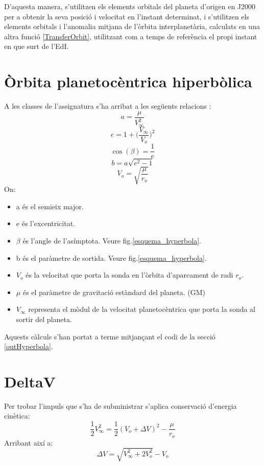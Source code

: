 D'aquesta manera, s'utilitzen els elements orbitals del planeta d'origen en J2000 per a obtenir la seva posició i velocitat en l'instant determinat, i s'utilitzen els elements orbitals i l'anomalia mitjana de l'òrbita interplanetària, calculats en una altra funció \ref{TransferOrbit}, utilitzant com a temps de referència el propi instant en que surt de l'EdI.

\section{Òrbita planetocèntrica hiperbòlica}
A les classes de l'assignatura s'ha arribat a les següents relacions \cite{Calaf2017d}:
\begin{equation}
a = \frac{\mu}{V_{\infty}^{2}}
\end{equation}
\begin{equation}
e = 1 + \Big(\frac{V_{\infty}}{V_{o}}\Big)^2
\end{equation}
\begin{equation}
\cos(\beta) = \frac{1}{e}
\end{equation}
\begin{equation}
b = a\sqrt{e^2-1}
\end{equation}
\begin{equation}
V_o = \sqrt{\frac{\mu}{r_o}}
\end{equation}
On:
\begin{itemize}
	\item a és el semieix major.
	\item e és l'excentricitat.
	\item $\beta$ és l'angle de l'asímptota. Veure fig.\ref{esquema_hyperbola}.
	\item b és el paràmetre de sortida. Veure fig.\ref{esquema_hyperbola}.
	\item $V_o$ és la velocitat que porta la sonda en l'òrbita d'aparcament de radi $r_o$.
	\item $\mu$ és el paràmetre de gravitació estàndard del planeta. (GM)
	\item $V_{\infty}$ representa el mòdul de la velocitat planetocèntrica que porta la sonda al sortir del planeta.
\end{itemize}
Aquests càlculs s'han portat a terme mitjançant el codi de la secció \ref{outHyperbola}.
\section{DeltaV}
Per trobar l'impuls que s'ha de subministrar s'aplica conservació d'energia cinètica:
\begin{equation*}
\frac{1}{2}V_{\infty}^2 =\frac{1}{2}(V_o + \Delta V)^2 - \frac{\mu}{r_o}
\end{equation*}
Arribant així a:
\begin{equation}
\Delta V = \sqrt{V_{\infty}^2+2V_{o}^2} - V_o
\end{equation}
